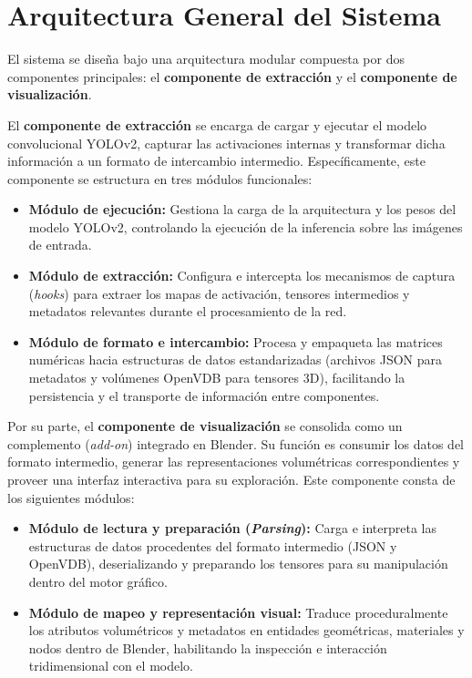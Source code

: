 \section{Arquitectura General del Sistema}
El sistema se diseña bajo una arquitectura modular compuesta por dos componentes principales: el 
\textbf{componente de extracción} y el \textbf{componente de visualización}.
\medskip

El \textbf{componente de extracción} se encarga de cargar y ejecutar el modelo convolucional YOLOv2, 
capturar las activaciones internas y transformar dicha información a un formato de intercambio intermedio. 
Específicamente, este componente se estructura en tres módulos funcionales:

\begin{itemize}
    \item \textbf{Módulo de ejecución:} Gestiona la carga de la arquitectura y los pesos del modelo YOLOv2, 
    controlando la ejecución de la inferencia sobre las imágenes de entrada.
    \item \textbf{Módulo de extracción:} Configura e intercepta los mecanismos de captura (\textit{hooks}) 
    para extraer los mapas de activación, tensores intermedios y metadatos relevantes durante el procesamiento 
    de la red.
    \item \textbf{Módulo de formato e intercambio:} Procesa y empaqueta las matrices numéricas hacia estructuras 
    de datos estandarizadas (archivos JSON para metadatos y volúmenes OpenVDB para tensores 3D), facilitando la 
    persistencia y el transporte de información entre componentes.
\end{itemize}
\medskip

Por su parte, el \textbf{componente de visualización} se consolida como un complemento (\textit{add-on}) 
integrado en Blender. Su función es consumir los datos del formato intermedio, generar las representaciones 
volumétricas correspondientes y proveer una interfaz interactiva para su exploración. Este componente consta 
de los siguientes módulos:

\begin{itemize}
    \item \textbf{Módulo de lectura y preparación (\textit{Parsing}):} Carga e interpreta las estructuras de 
    datos procedentes del formato intermedio (JSON y OpenVDB), deserializando y preparando los tensores para 
    su manipulación dentro del motor gráfico.
    \item \textbf{Módulo de mapeo y representación visual:} Traduce proceduralmente los atributos volumétricos 
    y metadatos en entidades geométricas, materiales y nodos dentro de Blender, habilitando la inspección e 
    interacción tridimensional con el modelo.
\end{itemize}

